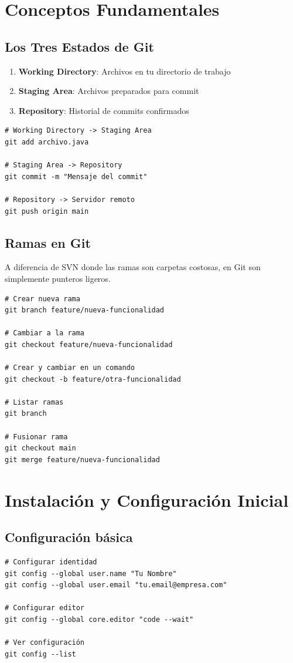 \documentclass[12pt,a4paper]{article}
\begin{document}
\section{Conceptos Fundamentales}

\subsection{Los Tres Estados de Git}
\begin{enumerate}
    \item \textbf{Working Directory}: Archivos en tu directorio de trabajo
    \item \textbf{Staging Area}: Archivos preparados para commit
    \item \textbf{Repository}: Historial de commits confirmados
\end{enumerate}

\begin{lstlisting}[caption=Flujo básico de estados]
# Working Directory -> Staging Area
git add archivo.java

# Staging Area -> Repository
git commit -m "Mensaje del commit"

# Repository -> Servidor remoto
git push origin main
\end{lstlisting}

\subsection{Ramas en Git}
A diferencia de SVN donde las ramas son carpetas costosas, en Git son simplemente punteros ligeros.

\begin{lstlisting}[caption=Manejo básico de ramas]
# Crear nueva rama
git branch feature/nueva-funcionalidad

# Cambiar a la rama
git checkout feature/nueva-funcionalidad

# Crear y cambiar en un comando
git checkout -b feature/otra-funcionalidad

# Listar ramas
git branch

# Fusionar rama
git checkout main
git merge feature/nueva-funcionalidad
\end{lstlisting}

\section{Instalación y Configuración Inicial}

\subsection{Configuración básica}
\begin{lstlisting}[caption=Configuración inicial de Git]
# Configurar identidad
git config --global user.name "Tu Nombre"
git config --global user.email "tu.email@empresa.com"

# Configurar editor
git config --global core.editor "code --wait"

# Ver configuración
git config --list
\end{lstlisting}
\end{document}
